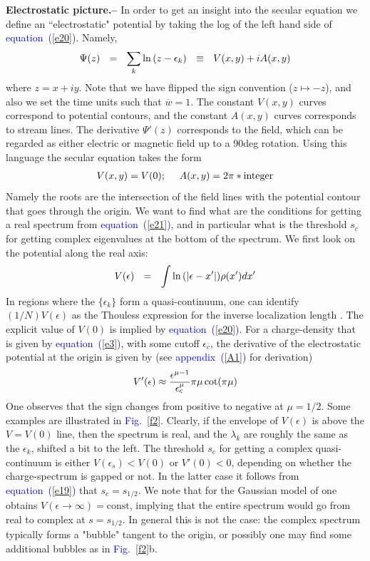 \documentclass[aps,pre,floats,floatfix,twocolumn]{revtex4}
\newcommand{\be}[1]{\begin{eqnarray}\ifthenelse{#1=-1}{\nonumber}{\ifthenelse{#1=0}{}{\label{e#1}}}}
\newcommand{\eeq}{\end{eqnarray}}
\newcommand{\Eq}[1]{\textcolor{blue}{{equation}\!~(\ref{#1})}}
\newcommand{\Ap}[1]{\textcolor{blue}{{appendix}\!~(\ref{#1})}}
\newcommand{\Fig}[1]{\textcolor{blue}{Fig.}\!\!~\ref{#1}}
\newcommand{\sect}[1]{{\bf #1.-- }}
\begin{document}
\sect{Electrostatic picture}
%
In order to get an insight into the secular equation we 
define an ``electrostatic" potential by taking the log 
of the left hand side of \Eq{e20}. Namely, 
%
\be{22}
\Psi(z) \ \ = \ \ \sum_k \ln\left(z-\epsilon_k\right) \ \ \equiv \ \ V(x,y)+iA(x,y)
\eeq
%
where ${z=x+iy}$. Note that we have flipped the sign convention (${z\mapsto -z}$), 
and also we set the time units such that $\overline{w}=1$.
% 
The constant ${V(x,y)}$ curves correspond to potential contours,
and the constant ${A(x,y)}$ curves corresponds 
to stream lines. The derivative $\Psi'(z)$ corresponds to the field, 
which can be regarded as either electric or magnetic field up to a 90deg rotation.       
Using this language the secular equation takes the form
%
\be{21}
V(x,y)=V(0); \ \ \ \ A(x,y)=2\pi*\text{integer} 
\eeq
%
Namely the roots are the intersection of the field lines with the 
potential contour that goes through the origin. 
%
%
We want to find what are the conditions for getting 
a real spectrum from \Eq{e21}, and in particular what 
is the threshold $s_c$ for getting complex eigenvalues 
at the bottom of the spectrum. 
We first look on the potential along the real axis:
%
\be{23}
V(\epsilon) \ \ = \ \  \int \ln \left(|\epsilon-x' \right|) \rho(x')dx' 
\eeq
%
In regions where the $\{\epsilon_k\}$ form a quasi-continuum,  
one can identify $(1/N)V(\epsilon)$ as the Thouless expression  
for the inverse localization length \cite{Shnerb1}.
The explicit value of $V(0)$ is implied by \Eq{e20}.   
For a charge-density that is given by \Eq{e3}, with some cutoff $\epsilon_c$,
the derivative of the electrostatic potential at the origin is 
given by (see \Ap{A1} for derivation)
%
\be{19}
V'(\epsilon) \approx  \frac{ \epsilon^{\mu-1}}{\epsilon_c^{\mu}} \pi \mu \cot(\pi \mu)
\eeq
%
One observes that the sign changes from positive to negative at $\mu=1/2$.
Some examples are illustrated in \Fig{f2}.
Clearly, if the envelope of $V(\epsilon)$ is above 
the $V=V(0)$ line, then the spectrum is real, and the $\lambda_k$ are roughly 
the same as the $\epsilon_k$, shifted a bit to the left. 
%
The threshold $s_c$ for getting a complex quasi-continuum 
is either  ${V(\epsilon_s)<V(0)}$  or  ${V'(0)<0}$, 
depending on whether the charge-spectrum is gapped or not. 
In the latter case it follows from \Eq{e19} that ${s_c=s_{1/2}}$.
%
We note that for the Gaussian model of \cite{odh3}
one obtains ${V(\epsilon \rightarrow \infty) = \text{const}}$,  
implying that the entire spectrum would go from real to complex at $s=s_{1/2}$. 
In general this is not the case: the complex spectrum typically 
forms a "bubble" tangent to the origin, or possibly 
one may find some additional bubbles as in \Fig{f2}b.   
\end{document}
